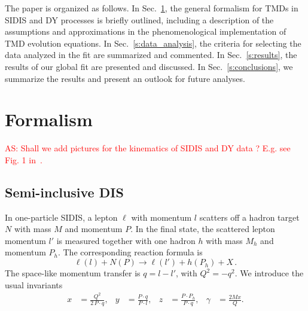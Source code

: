 \documentclass[aps,preprintnumbers,showpacs,nofootinbib,superscriptaddress,floatfix]{revtex4}
\begin{document}
The paper is organized as follows. In Sec.~\ref{s:theory}, the general
formalism for TMDs in SIDIS and DY processes is briefly outlined, including a
description of the assumptions and approximations in the phenomenological
implementation of TMD evolution equations. In Sec.~\ref{s:data_analysis}, the criteria
for selecting the data analyzed in the fit are summarized and commented. In
Sec.~\ref{s:results}, the results of our global fit are presented and
discussed. In Sec.~\ref{s:conclusions}, we summarize the results and present an outlook for future analyses. 
   

\section{Formalism}
\label{s:theory}

\textcolor{red}{AS: Shall we add pictures for the kinematics of SIDIS and DY data ? E.g. see Fig. 1 in~\cite{Signori:2013mda}.}

\subsection{Semi-inclusive DIS}
\label{ss:SIDIS_formalism}

In one-particle SIDIS, a lepton $\ell$ with momentum $l$ scatters 
off a hadron target $N$ with mass $M$ and momentum
$P$. In the final state, the scattered lepton momentum 
$l'$ is measured together with
one hadron $h$ with mass $M_h$
and momentum $P_h$. The corresponding reaction formula is  
\begin{equation}
  \label{e:sidis}
\ell(l) + N(P) \to \ell(l') + h(P_h) + X \, .
\end{equation}
The space-like momentum transfer is $q = l - l'$, with $Q^2 = - q^2$. We
introduce the usual invariants  
\begin{align}
  \label{e:xyz}
x &= \frac{Q^2}{2\,P\cdot q},
&
y &= \frac{P \cdot q}{P \cdot l},
&
z &= \frac{P \cdot P_h}{P\cdot q},
&
\gamma &= \frac{2 M x}{Q} .
\end{align}
\end{document}
